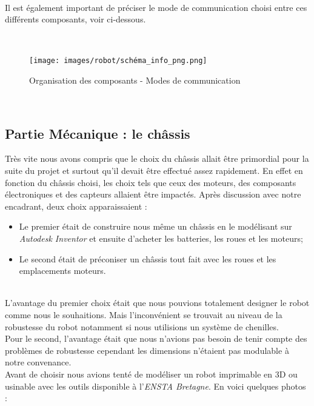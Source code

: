 \documentclass[french]{rapportENSTAB}
\begin{document}
\\

Il est également important de préciser le mode de communication choisi entre ces différents composants, voir ci-dessous.

\\

 
 \begin{figure}[H]
    \centering
    \texttt{[image: images/robot/schéma\_info\_png.png]}
    \caption{Organisation des composants - Modes de communication}
    \label{fig:cdcf}
\end{figure}

\\

\subsection{Partie Mécanique : le châssis}
Très vite nous avons compris que le choix du châssis allait être primordial pour la suite du projet et surtout qu'il devait être effectué assez rapidement. En effet en fonction du châssis choisi, les choix tels que ceux des moteurs, des composants électroniques et des capteurs allaient être impactés. Après discussion avec notre encadrant, deux choix apparaissaient : \begin{itemize}[label=\textbullet, font=\small\color{blue}]
    \item Le premier était de construire nous même un châssis en le modélisant sur \textit{Autodesk Inventor} et ensuite d'acheter les batteries, les roues et les moteurs;
    \item Le second était de préconiser un châssis tout fait avec les roues et les emplacements moteurs.
\end{itemize}\\

L’avantage du premier choix était que nous pouvions totalement designer le robot comme nous le souhaitions. Mais l’inconvénient se trouvait au niveau de la robustesse du robot notamment si nous utilisions un système de chenilles. \\

Pour le second, l'avantage était que nous n’avions pas besoin de tenir compte des problèmes de robustesse cependant les dimensions n'étaient pas modulable à notre convenance. \\

Avant de choisir nous avions tenté de modéliser un robot imprimable en 3D ou usinable avec les outils disponible à l'\textit{ENSTA Bretagne}. En voici quelques photos :
\end{document}

